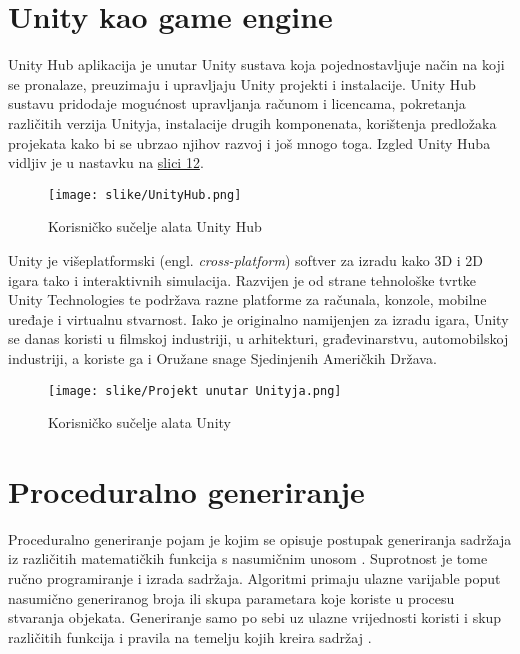 \documentclass[]{foi} %
\begin{document}
\section{Unity kao game engine}
Unity Hub aplikacija je unutar Unity sustava koja pojednostavljuje način na koji se pronalaze, preuzimaju i upravljaju Unity projekti i instalacije. Unity Hub sustavu pridodaje mogućnost upravljanja računom i licencama, pokretanja različitih verzija Unityja, instalacije drugih komponenata, korištenja predložaka projekata kako bi se ubrzao njihov razvoj i još mnogo toga. Izgled Unity Huba vidljiv je u nastavku na \hyperref[img: unityHub]{slici 12}. \cite{unityUnity}

\begin{figure}[H]
    \centering
    \texttt{[image: slike/UnityHub.png]}
    \caption{Korisničko sučelje alata Unity Hub}
\end{figure}
\label{img: unityHub}

Unity je višeplatformski (engl. \textit{cross-platform}) softver za izradu kako 3D i 2D igara tako i interaktivnih simulacija. Razvijen je od strane tehnološke tvrtke Unity Technologies te podržava razne platforme za računala, konzole, mobilne uređaje i virtualnu stvarnost. Iako je originalno namijenjen za izradu igara, Unity se danas koristi u filmskoj industriji, u arhitekturi, građevinarstvu, automobilskoj industriji, a koriste ga i Oružane snage Sjedinjenih Američkih Država. \cite{unityWiki}

\begin{figure}[H]
    \centering
    \texttt{[image: slike/Projekt unutar Unityja.png]}
    \caption{Korisničko sučelje alata Unity}
\end{figure}

\section{Proceduralno generiranje}
Proceduralno generiranje pojam je kojim se opisuje postupak generiranja sadržaja iz različitih matematičkih funkcija s nasumičnim unosom \cite[str. 8]{Blomberg2018AnEO}. Suprotnost je tome ručno programiranje i izrada sadržaja. Algoritmi primaju ulazne varijable poput nasumično generiranog broja ili skupa parametara koje koriste u procesu stvaranja objekata. Generiranje samo po sebi uz ulazne vrijednosti koristi i skup različitih funkcija i pravila na temelju kojih kreira sadržaj \cite[str. 1]{Blomberg2018AnEO}. 
\end{document}
